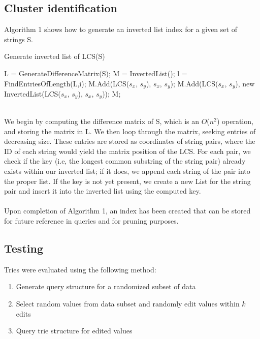 \documentclass[pdftex,12pt,letter]{article}
\DeclareMathOperator{\length}{length}
\begin{document}
\subsection{Cluster identification}
Algorithm 1 shows how to generate an inverted list index for a given set of strings S. 
\begin{algorithm}
\caption{Generate inverted list of LCS(S)}
\label{Algorithm 2}
\begin{algorithmic}[1]
\STATE L = GenerateDifferenceMatrix(S);
\STATE M = InvertedList();
\FOR{$i = \max(\length(s_1), ..., \length(s_n))$ \textbf{to} $0$}
\STATE l = FindEntriesOfLength(L,i);
\STATE M.Add(LCS($s_x$, $s_y$), $s_x$, $s_y$);
\ELSE
\STATE M.Add(LCS($s_x$, $s_y$), new InvertedList(LCS($s_x$, $s_y$), $s_x$, $s_y$));
\ENDIF
\ENDFOR
\ENDFOR
\RETURN M;
\end{algorithmic}
\end{algorithm}
\\
We begin by computing the difference matrix of S, which is an $O$($n^2$) operation, and storing the matrix in L. We then loop through the matrix, seeking entries of decreasing size. These entries are stored as coordinates of string pairs, where the ID of each string would yield the matrix position of the LCS. For each pair, we check if the key (i.e, the longest common substring of the string pair) already exists within our inverted list; if it does, we append each string of the pair into the proper list. If the key is not yet present, we create a new List for the string pair and insert it into the inverted list using the computed key.\\
\\
Upon completion of Algorithm 1, an index has been created that can be stored for future reference in queries and for pruning purposes.

\subsection{Testing}
Tries were evaluated using the following method:

\begin{enumerate}
\item Generate query structure for a randomized subset of data
\item Select random values from data subset and randomly edit values within $k$ edits
\item Query trie structure for edited values
\end{enumerate}
\end{document}
